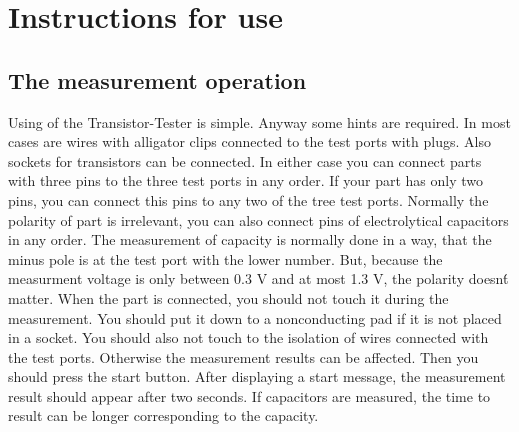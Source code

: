 \chapter{Instructions for use}
\label{sec:manual}
\section{The measurement operation}
Using of the Transistor-Tester is simple.
Anyway some hints are required.
In most cases are wires with alligator clips connected to the test ports with plugs.
Also sockets for transistors can be connected.
In either case you can connect parts with three pins to the three test ports in any order.
If your part has only two pins, you can connect this pins to any two of the tree test ports.
Normally the polarity of part is irrelevant, you can also connect pins of electrolytical capacitors in any order. 
The measurement of capacity is normally done in a way, that the minus pole is at the test port with the lower number.
But, because the measurment voltage is only between 0.3 V and at most 1.3 V, the polarity doesn\'t matter.
When the part is connected, you should not touch it during the measurement. You should put it down to a nonconducting pad
if it is not placed in a socket. You should also not touch to the isolation of wires connected with the test ports.
Otherwise the measurement results can be affected.
Then you should press the start button.
After displaying a start message, the measurement result should appear after two seconds.
If capacitors are measured, the time to result can be longer corresponding to the capacity.

